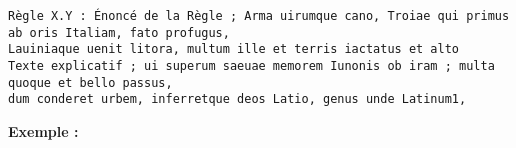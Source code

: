 \begin{verbatim}
Règle X.Y : Énoncé de la Règle ; Arma uirumque cano, Troiae qui primus ab oris Italiam, fato profugus,
Lauiniaque uenit litora, multum ille et terris iactatus et alto
Texte explicatif ; ui superum saeuae memorem Iunonis ob iram ; multa quoque et bello passus,
dum conderet urbem, inferretque deos Latio, genus unde Latinum1,
\end{verbatim}
\begin{large}
\textbf{Exemple :}
\end{large}
\medskip


\bigskip

\pagebreak